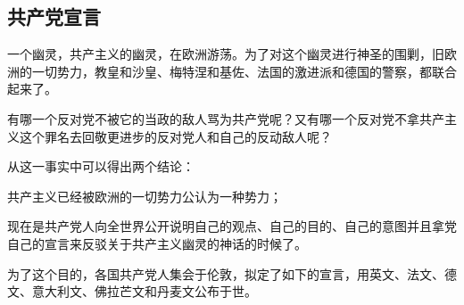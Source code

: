 \documentclass[UTF8,zihao=-4,a4paper]{ctexart}
\begin{document}
\subsection*{共产党宣言}
一个幽灵，共产主义的幽灵，在欧洲游荡。为了对这个幽灵进行神圣的围剿，旧欧洲的一切势力，教皇和沙皇、梅特涅和基佐、法国的激进派和德国的警察，都联合起来了。\par
有哪一个反对党不被它的当政的敌人骂为共产党呢？又有哪一个反对党不拿共产主义这个罪名去回敬更进步的反对党人和自己的反动敌人呢？\par
从这一事实中可以得出两个结论：\par
共产主义已经被欧洲的一切势力公认为一种势力；\par
现在是共产党人向全世界公开说明自己的观点、自己的目的、自己的意图并且拿党自己的宣言来反驳关于共产主义幽灵的神话的时候了。\par
为了这个目的，各国共产党人集会于伦敦，拟定了如下的宣言，用英文、法文、德文、意大利文、佛拉芒文和丹麦文公布于世。\par
\end{document}
